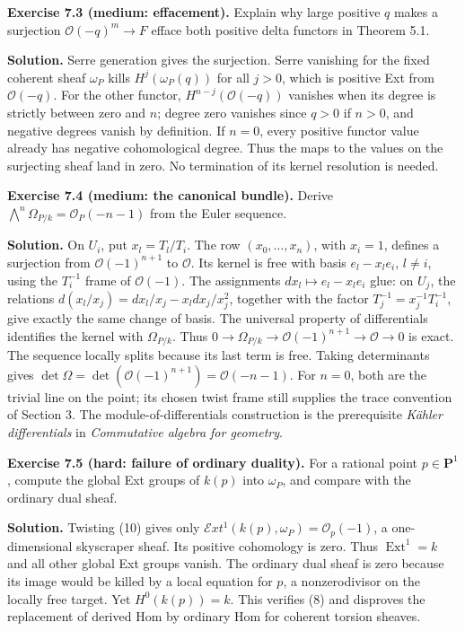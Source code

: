 \documentclass[11pt]{article}
\begin{document}
\textbf{Exercise 7.3 (medium: effacement).} Explain why large positive
\(q\) makes a surjection \(\mathcal O(-q)^m\to F\) efface both positive
delta functors in Theorem 5.1.

\textbf{Solution.} Serre generation gives the surjection. Serre
vanishing for the fixed coherent sheaf \(\omega_P\) kills
\(H^j(\omega_P(q))\) for all \(j>0\), which is positive Ext from
\(\mathcal O(-q)\). For the other functor, \(H^{n-j}(\mathcal O(-q))\)
vanishes when its degree is strictly between zero and \(n\); degree zero
vanishes since \(q>0\) if \(n>0\), and negative degrees vanish by
definition. If \(n=0\), every positive functor value already has
negative cohomological degree. Thus the maps to the values on the
surjecting sheaf land in zero. No termination of its kernel resolution
is needed.

\textbf{Exercise 7.4 (medium: the canonical bundle).} Derive
\(\bigwedge^n\Omega_{P/k}=\mathcal O_P(-n-1)\) from the Euler sequence.

\textbf{Solution.} On \(U_i\), put \(x_l=T_l/T_i\). The row
\((x_0,\ldots,x_n)\), with \(x_i=1\), defines a surjection from
\(\mathcal O(-1)^{n+1}\) to \(\mathcal O\). Its kernel is free with
basis \(e_l-x_l e_i\), \(l\ne i\), using the \(T_i^{-1}\) frame of
\(\mathcal O(-1)\). The assignments \(dx_l\mapsto e_l-x_l e_i\) glue: on
\(U_j\), the relations \(d(x_l/x_j)=dx_l/x_j-x_l dx_j/x_j^2\), together
with the factor \(T_j^{-1}=x_j^{-1}T_i^{-1}\), give exactly the same
change of basis. The universal property of differentials identifies the
kernel with \(\Omega_{P/k}\). Thus
\(0\to\Omega_{P/k}\to\mathcal O(-1)^{n+1}\to\mathcal O\to0\) is exact.
The sequence locally splits because its last term is free. Taking
determinants gives
\(\det\Omega=\det(\mathcal O(-1)^{n+1})=\mathcal O(-n-1)\). For \(n=0\),
both are the trivial line on the point; its chosen twist frame still
supplies the trace convention of Section 3. The module-of-differentials
construction is the prerequisite \emph{Kähler differentials} in
\emph{Commutative algebra for geometry}.

\textbf{Exercise 7.5 (hard: failure of ordinary duality).} For a
rational point \(p\in\mathbf P^1\), compute the global Ext groups of
\(k(p)\) into \(\omega_P\), and compare with the ordinary dual sheaf.

\textbf{Solution.} Twisting (10) gives only
\(\mathcal E xt^1(k(p),\omega_P)=\mathcal O_p(-1)\), a one-dimensional
skyscraper sheaf. Its positive cohomology is zero. Thus
\(\operatorname{Ext}^1=k\) and all other global Ext groups vanish. The
ordinary dual sheaf is zero because its image would be killed by a local
equation for \(p\), a nonzerodivisor on the locally free target. Yet
\(H^0(k(p))=k\). This verifies (8) and disproves the replacement of
derived Hom by ordinary Hom for coherent torsion sheaves.
\end{document}
